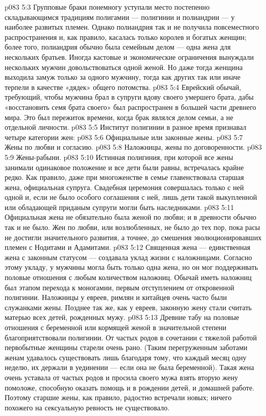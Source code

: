 \vs p083 5:3 Групповые браки понемногу уступали место постепенно складывающимся традициям полигамии --- полигинии и полиандрии --- у наиболее развитых племен. Однако полиандрия так и не получила повсеместного распространения и, как правило, касалась только королев и богатых женщин; более того, полиандрия обычно была семейным делом --- одна жена для нескольких братьев. Иногда кастовые и экономические ограничения вынуждали нескольких мужчин довольствоваться одной женой. Но даже тогда женщина выходила замуж только за одного мужчину, тогда как других так или иначе терпели в качестве «дядек» общего потомства.
\vs p083 5:4 Еврейский обычай, требующий, чтобы мужчина брал в супруги вдову своего умершего брата, дабы «восстановить семя брата своего» был распространен в большей части древнего мира. Это был пережиток времени, когда брак являлся делом семьи, а не отдельной личности.
\vs p083 5:5 Институт полигинии в разное время признавал четыре категории жен:
\vs p083 5:6 \bibnobreakspace Официальные или законные жены.
\vs p083 5:7 \bibnobreakspace Жены по любви и согласию.
\vs p083 5:8 \bibnobreakspace Наложницы, жены по договоренности.
\vs p083 5:9 \bibnobreakspace Жены\hyp{}рабыни.
\vs p083 5:10 \pc Истинная полигиния, при которой все жены занимали одинаковое положение и все дети были равны, встречалась крайне редко. Как правило, даже при многоженстве в семье главенствовала старшая жена, официальная супруга. Свадебная церемония совершалась только с ней одной и, если не было особого соглашения с ней, лишь дети такой выкупленной или обладающей приданым супруги могли быть наследниками.
\vs p083 5:11 Официальная жена не обязательно была женой по любви; и в древности обычно так и не было. Жен по любви, или возлюбленных, не было до тех пор, пока расы не достигли значительного развития, а точнее, до смешения эволюционировавших племен с Нодитами и Адамитами.
\vs p083 5:12 Священная жена --- единственная жена с законным статусом --- создавала уклад жизни с наложницами. Согласно этому укладу, у мужчины могла быть только одна жена, но он мог поддерживать половые отношения с любым количеством наложниц. Обычай иметь наложниц был этапом перехода к моногамии, первым отступлением от откровенной полигинии. Наложницы у евреев, римлян и китайцев очень часто были служанками жены. Позднее так же, как у евреев, законную жену стали считать матерью всех детей, рожденных мужу.
\vs p083 5:13 Древние табу на половые отношения с беременной или кормящей женой в значительной степени благоприятствовали полигинии. От частых родов в сочетании с тяжелой работой первобытные женщины старели очень рано. (Таким перегруженным заботами женам удавалось существовать лишь благодаря тому, что каждый месяц одну неделю, их держали в уединении --- если она не была беременной). Такая жена очень уставала от частых родов и просила своего мужа взять вторую жену помоложе, способную оказать помощь и в рождении детей, и домашней работе. Поэтому старшие жены, как правило, радостно встречали новых; ничего похожего на сексуальную ревность не существовало.
